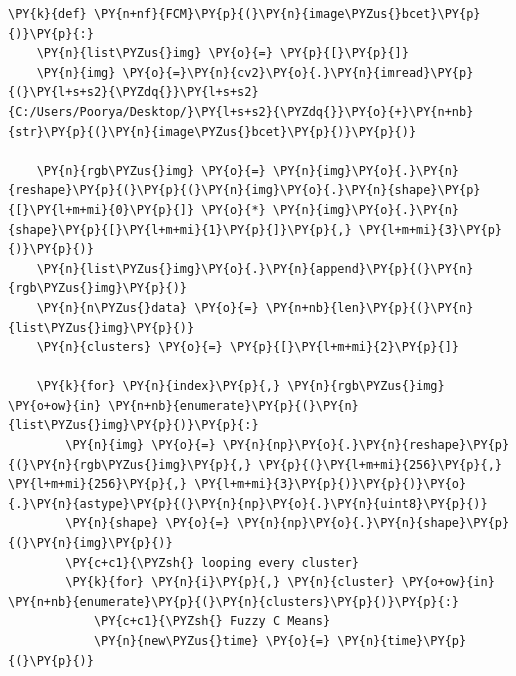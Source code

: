 \begin{tcolorbox}[breakable, size=fbox, boxrule=1pt, pad at break*=1mm,colback=cellbackground, colframe=cellborder]
	\begin{Verbatim}[commandchars=\\\{\}]
\PY{k}{def} \PY{n+nf}{FCM}\PY{p}{(}\PY{n}{image\PYZus{}bcet}\PY{p}{)}\PY{p}{:}
    \PY{n}{list\PYZus{}img} \PY{o}{=} \PY{p}{[}\PY{p}{]}
    \PY{n}{img} \PY{o}{=}\PY{n}{cv2}\PY{o}{.}\PY{n}{imread}\PY{p}{(}\PY{l+s+s2}{\PYZdq{}}\PY{l+s+s2}{C:/Users/Poorya/Desktop/}\PY{l+s+s2}{\PYZdq{}}\PY{o}{+}\PY{n+nb}{str}\PY{p}{(}\PY{n}{image\PYZus{}bcet}\PY{p}{)}\PY{p}{)}

    \PY{n}{rgb\PYZus{}img} \PY{o}{=} \PY{n}{img}\PY{o}{.}\PY{n}{reshape}\PY{p}{(}\PY{p}{(}\PY{n}{img}\PY{o}{.}\PY{n}{shape}\PY{p}{[}\PY{l+m+mi}{0}\PY{p}{]} \PY{o}{*} \PY{n}{img}\PY{o}{.}\PY{n}{shape}\PY{p}{[}\PY{l+m+mi}{1}\PY{p}{]}\PY{p}{,} \PY{l+m+mi}{3}\PY{p}{)}\PY{p}{)}
    \PY{n}{list\PYZus{}img}\PY{o}{.}\PY{n}{append}\PY{p}{(}\PY{n}{rgb\PYZus{}img}\PY{p}{)}
    \PY{n}{n\PYZus{}data} \PY{o}{=} \PY{n+nb}{len}\PY{p}{(}\PY{n}{list\PYZus{}img}\PY{p}{)}
    \PY{n}{clusters} \PY{o}{=} \PY{p}{[}\PY{l+m+mi}{2}\PY{p}{]}

    \PY{k}{for} \PY{n}{index}\PY{p}{,} \PY{n}{rgb\PYZus{}img} \PY{o+ow}{in} \PY{n+nb}{enumerate}\PY{p}{(}\PY{n}{list\PYZus{}img}\PY{p}{)}\PY{p}{:}
        \PY{n}{img} \PY{o}{=} \PY{n}{np}\PY{o}{.}\PY{n}{reshape}\PY{p}{(}\PY{n}{rgb\PYZus{}img}\PY{p}{,} \PY{p}{(}\PY{l+m+mi}{256}\PY{p}{,} \PY{l+m+mi}{256}\PY{p}{,} \PY{l+m+mi}{3}\PY{p}{)}\PY{p}{)}\PY{o}{.}\PY{n}{astype}\PY{p}{(}\PY{n}{np}\PY{o}{.}\PY{n}{uint8}\PY{p}{)}
        \PY{n}{shape} \PY{o}{=} \PY{n}{np}\PY{o}{.}\PY{n}{shape}\PY{p}{(}\PY{n}{img}\PY{p}{)}
        \PY{c+c1}{\PYZsh{} looping every cluster}
        \PY{k}{for} \PY{n}{i}\PY{p}{,} \PY{n}{cluster} \PY{o+ow}{in} \PY{n+nb}{enumerate}\PY{p}{(}\PY{n}{clusters}\PY{p}{)}\PY{p}{:}
            \PY{c+c1}{\PYZsh{} Fuzzy C Means}
            \PY{n}{new\PYZus{}time} \PY{o}{=} \PY{n}{time}\PY{p}{(}\PY{p}{)}


\end{Verbatim}
\end{tcolorbox}
